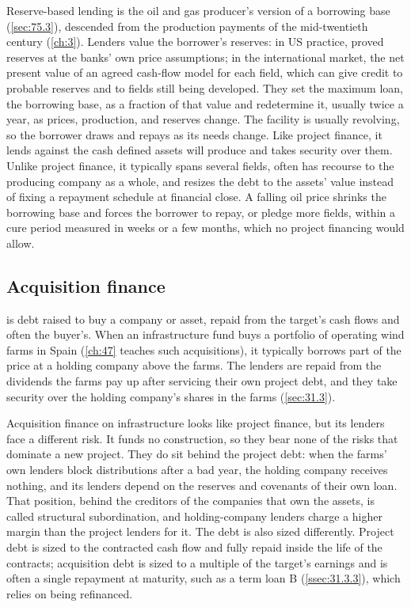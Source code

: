 Reserve-based lending is the oil and gas producer's version of a borrowing base (\cref{sec:75.3}), descended from the production payments of the mid-twentieth century (\cref{ch:3}). Lenders value the borrower's reserves: in US practice, proved reserves at the banks' own price assumptions; in the international market, the net present value of an agreed cash-flow model for each field, which can give credit to probable reserves and to fields still being developed. They set the maximum loan, the borrowing base, as a fraction of that value and redetermine it, usually twice a year, as prices, production, and reserves change. The facility is usually revolving, so the borrower draws and repays as its needs change. Like project finance, it lends against the cash defined assets will produce and takes security over them. Unlike project finance, it typically spans several fields, often has recourse to the producing company as a whole, and resizes the debt to the assets' value instead of fixing a repayment schedule at financial close. A falling oil price shrinks the borrowing base and forces the borrower to repay, or pledge more fields, within a cure period measured in weeks or a few months, which no project financing would allow. 

\subsection{Acquisition finance}\label{ssec:2.4.4}

 is debt raised to buy a company or asset, repaid from the target's cash flows and often the buyer's. When an infrastructure fund buys a portfolio of operating wind farms in Spain (\cref{ch:47} teaches such acquisitions), it typically borrows part of the price at a holding company above the farms. The lenders are repaid from the dividends the farms pay up after servicing their own project debt, and they take security over the holding company's shares in the farms (\cref{sec:31.3}).

Acquisition finance on infrastructure looks like project finance, but its lenders face a different risk. It funds no construction, so they bear none of the risks that dominate a new project. They do sit behind the project debt: when the farms' own lenders block distributions after a bad year, the holding company receives nothing, and its lenders depend on the reserves and covenants of their own loan. That position, behind the creditors of the companies that own the assets, is called structural subordination, and holding-company lenders charge a higher margin than the project lenders for it. The debt is also sized differently. Project debt is sized to the contracted cash flow and fully repaid inside the life of the contracts; acquisition debt is sized to a multiple of the target's earnings and is often a single repayment at maturity, such as a term loan B (\cref{ssec:31.3.3}), which relies on being refinanced.

